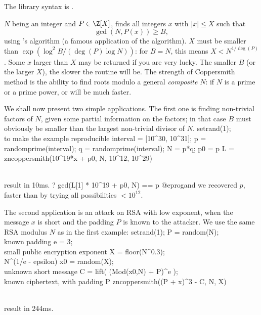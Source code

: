 The library syntax is .

\label{se:zncoppersmith}
$N$ being an integer and $P\in \Z[X]$, finds all integers $x$ with
$|x| \leq X$ such that
$$\gcd(N, P(x)) \geq B,$$
using 's algorithm (a famous application of the 
algorithm). $X$ must be smaller than $\exp(\log^2 B / (\deg(P) \log N))$:
for $B = N$, this means $X < N^{1/\deg(P)}$. Some $x$ larger than $X$ may
be returned if you are very lucky. The smaller $B$ (or the larger $X$), the
slower the routine will be. The strength of Coppersmith method is the
ability to find roots modulo a general \emph{composite} $N$: if $N$ is a prime
or a prime power,  or  will be much
faster.

We shall now present two simple applications. The first one is
finding non-trivial factors of $N$, given some partial information on the
factors; in that case $B$ must obviously be smaller than the largest
non-trivial divisor of $N$.
\bprog
setrand(1); \\ to make the example reproducible
interval = [10^30, 10^31];
p = randomprime(interval);
q = randomprime(interval); N = p*q;
p0 = p %
L = zncoppersmith(10^19*x + p0, N, 10^12, 10^29)

\\ result in 10ms.
? gcd(L[1] * 10^19 + p0, N) == p
@eprog\noindent and we recovered $p$, faster than by trying all
possibilities $ < 10^{12}$.

The second application is an attack on RSA with low exponent, when the
message $x$ is short and the padding $P$ is known to the attacker. We use
the same RSA modulus $N$ as in the first example:
\bprog
setrand(1);
P = random(N);    \\ known padding
e = 3;            \\ small public encryption exponent
X = floor(N^0.3); \\ N^(1/e - epsilon)
x0 = random(X);   \\ unknown short message
C = lift( (Mod(x0,N) + P)^e ); \\ known ciphertext, with padding P
zncoppersmith((P + x)^3 - C, N, X)

\\ result in 244ms.


